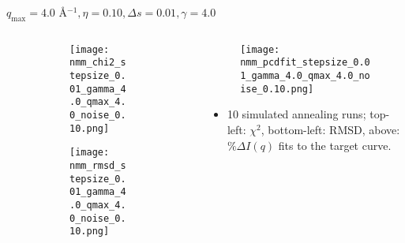 \documentclass{beamer}
\begin{document}
\begin{frame}{$ q_{\textrm{max}}=4.0 $ \AA $^{-1}, \eta=0.10, \Delta s=0.01, \gamma=4.0$}
	\begin{columns}
		\begin{column}{.5\textwidth}
			\begin{figure}[H]
			\centering
			\begin{subfigure}[b]{\textwidth}
				\centering
				\texttt{[image: nmm\_chi2\_stepsize\_0.01\_gamma\_4.0\_qmax\_4.0\_noise\_0.10.png]}
				\label{fig:}
			\end{subfigure}
			\begin{subfigure}[b]{\textwidth}
				\centering
				\texttt{[image: nmm\_rmsd\_stepsize\_0.01\_gamma\_4.0\_qmax\_4.0\_noise\_0.10.png]}
				\label{fig:}
			\end{subfigure}
			\end{figure}
		\end{column}
		\begin{column}{.5\textwidth}
			\begin{figure}[H]
				\centering
				\texttt{[image: nmm\_pcdfit\_stepsize\_0.01\_gamma\_4.0\_qmax\_4.0\_noise\_0.10.png]}
				\label{fig:}
			\end{figure}
			\begin{itemize}
				\item 10 simulated annealing runs; top-left: $\chi^2$, bottom-left: RMSD, above: $\%\Delta I(q)$ fits to the target curve.
			\end{itemize}
		\end{column}
	\end{columns}
\end{frame}
 
\end{document}
